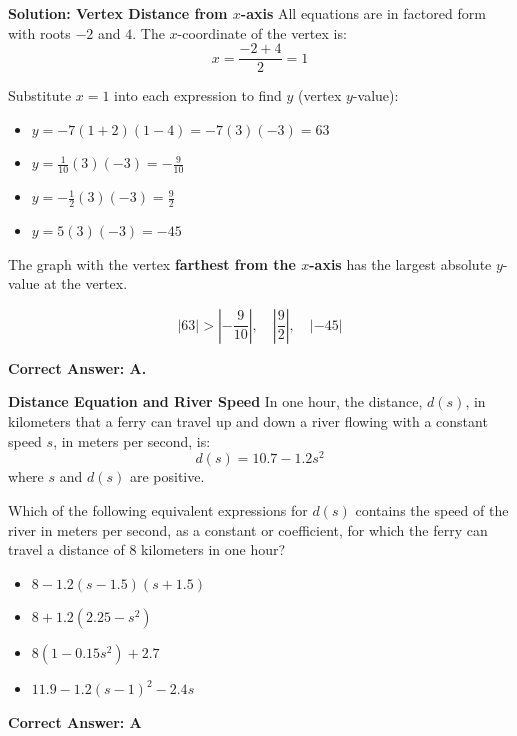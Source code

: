 \documentclass{beamer}
\begin{document}
\begin{frame}{\textbf{Solution: Vertex Distance from $x$-axis}}
All equations are in factored form with roots $-2$ and $4$. The $x$-coordinate of the vertex is:
\[
x = \frac{-2 + 4}{2} = 1
\]

Substitute $x = 1$ into each expression to find $y$ (vertex $y$-value):

\begin{itemize}
    \item[A.] $y = -7(1 + 2)(1 - 4) = -7(3)(-3) = 63$
    \item[B.] $y = \frac{1}{10}(3)(-3) = -\frac{9}{10}$
    \item[C.] $y = -\frac{1}{2}(3)(-3) = \frac{9}{2}$
    \item[D.] $y = 5(3)(-3) = -45$
\end{itemize}

The graph with the vertex \textbf{farthest from the $x$-axis} has the largest absolute $y$-value at the vertex.

\[
\left| 63 \right| > \left| -\frac{9}{10} \right|,\quad \left| \frac{9}{2} \right|,\quad \left| -45 \right|
\]

\textbf{Correct Answer: A.}
\end{frame}



\begin{frame}{\textbf{Distance Equation and River Speed}}
In one hour, the distance, $d(s)$, in kilometers that a ferry can travel up and down a river flowing with a constant speed $s$, in meters per second, is:
\[
d(s) = 10.7 - 1.2s^2
\]
where $s$ and $d(s)$ are positive.

Which of the following equivalent expressions for $d(s)$ contains the speed of the river in meters per second, as a constant or coefficient, for which the ferry can travel a distance of $8$ kilometers in one hour?

\begin{itemize}
    \item[A.] $8 - 1.2(s - 1.5)(s + 1.5)$
    \item[B.] $8 + 1.2(2.25 - s^2)$
    \item[C.] $8(1 - 0.15s^2) + 2.7$
    \item[D.] $11.9 - 1.2(s - 1)^2 - 2.4s$
\end{itemize}
\end{frame}


\begin{frame}
\textbf{Correct Answer: A}
\end{frame}
\end{document}
